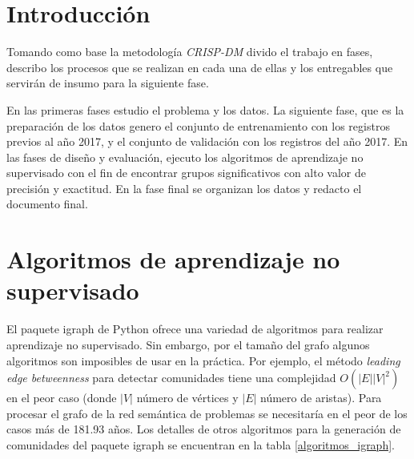 \section{Introducción}
Tomando como base la metodología \textit{\acrfull{CRISP-DM}} divido el trabajo en fases, describo los procesos que se realizan en cada una de ellas y los entregables que servirán de insumo para la siguiente fase.

En las primeras fases estudio el problema y los datos. La siguiente fase, que es la preparación de los datos genero el conjunto de entrenamiento con los registros previos al año 2017, y el conjunto de validación con los registros del año 2017. En las fases de diseño y evaluación, ejecuto los algoritmos de aprendizaje no supervisado con el fin de encontrar grupos significativos con alto valor de precisión y exactitud. En la fase final se organizan los datos y  redacto el documento final.

\section{Algoritmos de aprendizaje no supervisado}
\label{par:aprendizaje_nosupervisado}
El paquete igraph\cite{igraph} de Python ofrece una variedad de algoritmos para realizar aprendizaje no supervisado. Sin embargo, por el tamaño del grafo algunos algoritmos son imposibles de usar en la práctica. Por ejemplo, el método \textit{leading edge betweenness} para detectar comunidades tiene una complejidad $O(|E||V|^2)$ en el peor caso (donde $|V|$ número de vértices y $|E|$ número de aristas). Para procesar el grafo de la red semántica de problemas se necesitaría en el peor de los casos más de 181.93 años. Los detalles de otros algoritmos para la generación de comunidades del paquete igraph se encuentran en la tabla \ref{algoritmos_igraph}.

